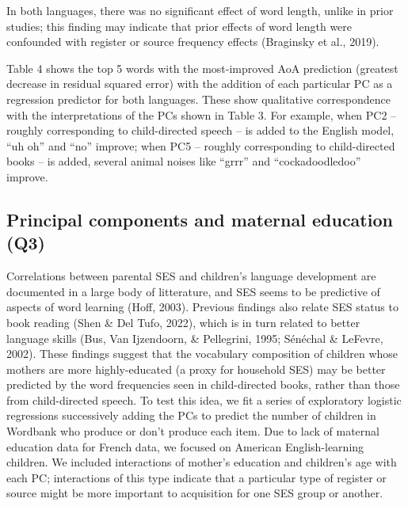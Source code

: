 \documentclass[10pt, letterpaper]{article}
\begin{document}
In both languages, there was no significant effect of word length,
unlike in prior studies; this finding may indicate that prior effects of
word length were confounded with register or source frequency effects
(Braginsky et al., 2019).

Table 4 shows the top 5 words with the most-improved AoA prediction
(greatest decrease in residual squared error) with the addition of each
particular PC as a regression predictor for both languages. These show
qualitative correspondence with the interpretations of the PCs shown in
Table 3. For example, when PC2 -- roughly corresponding to
child-directed speech -- is added to the English model, ``uh oh'' and
``no'' improve; when PC5 -- roughly corresponding to child-directed
books -- is added, several animal noises like ``grrr'' and
``cockadoodledoo'' improve.

\hypertarget{principal-components-and-maternal-education-q3}{%
\subsection{Principal components and maternal education
(Q3)}\label{principal-components-and-maternal-education-q3}}

Correlations between parental SES and children's language development
are documented in a large body of litterature, and SES seems to be
predictive of aspects of word learning (Hoff, 2003). Previous findings
also relate SES status to book reading (Shen \& Del Tufo, 2022), which
is in turn related to better language skills (Bus, Van Ijzendoorn, \&
Pellegrini, 1995; Sénéchal \& LeFevre, 2002). These findings suggest
that the vocabulary composition of children whose mothers are more
highly-educated (a proxy for household SES) may be better predicted by
the word frequencies seen in child-directed books, rather than those
from child-directed speech. To test this idea, we fit a series of
exploratory logistic regressions successively adding the PCs to predict
the number of children in Wordbank who produce or don't produce each
item. Due to lack of maternal education data for French data, we focused
on American English-learning children. We included interactions of
mother's education and children's age with each PC; interactions of this
type indicate that a particular type of register or source might be more
important to acquisition for one SES group or another.
\end{document}
